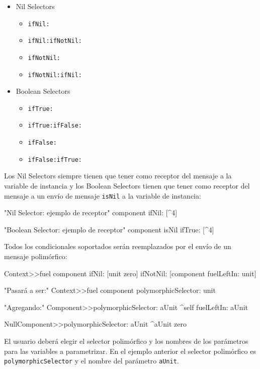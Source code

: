 \begin{itemize}
    \item Nil Selectors
    \begin{itemize}
        \item \lstinline{ifNil:}
        \item \lstinline{ifNil:ifNotNil:}
        \item \lstinline{ifNotNil:}
        \item \lstinline{ifNotNil:ifNil:}
    \end{itemize}

    \item Boolean Selectors
    \begin{itemize}
        \item \lstinline{ifTrue:}
        \item \lstinline{ifTrue:ifFalse:}
        \item \lstinline{ifFalse:}
        \item \lstinline{ifFalse:ifTrue:}
    \end{itemize}
\end{itemize}

Los Nil Selectors siempre tienen que tener como receptor del mensaje a la variable de instancia y los
Boolean Selectors tienen que tener como receptor del mensaje a un envío de mensaje \lstinline{isNil} a la
variable de instancia:

\begin{code}
"Nil Selector: ejemplo de receptor"
component ifNil: [^4]    

"Boolean Selector: ejemplo de receptor"
component isNil ifTrue: [^4]    
\end{code}

Todos los condicionales soportados serán reemplazados por el envío de un mensaje polimórfico:

\begin{code}
Context>>fuel
    component ifNil: [unit zero] ifNotNil: [component fuelLeftIn: unit]

"Pasará a ser:"
Context>>fuel
    component polymorphicSelector: unit

"Agregando:"
Component>>polymorphicSelector: aUnit
    ^self fuelLeftIn: aUnit

NullComponent>>polymorphicSelector: aUnit
    ^aUnit zero
\end{code}

El usuario deberá elegir el selector polimórfico y los nombres de los parámetros para las variables
a parametrizar. En el ejemplo anterior el selector polimórfico es \lstinline{polymorphicSelector} y
el nombre del parámetro \lstinline{aUnit}.


